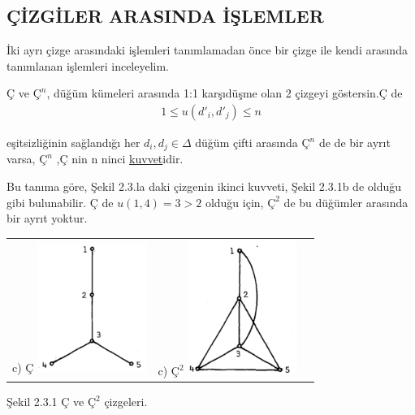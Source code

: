 \documentclass[11pt]{amsbook}
\begin{document}

    \subsection{ÇİZGİLER ARASINDA İŞLEMLER}
    
    İki ayrı çizge arasındaki işlemleri tanımlamadan önce bir çizge ile kendi arasında tanımlanan işlemleri inceleyelim.
    
    \begin{definition}
        Ç ve $Ç^n$, düğüm kümeleri arasında 1:1 karşıdüşme olan 2 çizgeyi göstersin.Ç de
        \begin{align*}
            1 \leq u(d'_{i},d'_{j}) \leq n
        \end{align*}
        
        \hfill\begin{minipage}{\dimexpr\textwidth-18mm}
        eşitsizliğinin sağlandığı her $d_{i},d_{j}\in\Delta$ düğüm çifti arasında $Ç^n$ de de bir ayrıt varsa, $Ç^n$ ,Ç nin n ninci \underline{kuvvet}idir. 
        \xdef\tpd{\the\prevdepth}
        \end{minipage} 
        
    \end{definition}
    
    Bu tanıma göre, Şekil 2.3.la daki çizgenin ikinci kuvveti, Şekil 2.3.1b de olduğu gibi bulunabilir. Ç de $u(1,4)=3>2$ olduğu için, $Ç^2$ de bu düğümler arasında bir ayrıt yoktur.
    
    
    \begin{table}[ht]
        \begin{tabular}{l@{\hskip 1.5in}c@{\hskip 0.5in}c}
            \item[c)] Ç
            \includegraphics[width=1.4in]{images/ceyhun-065-fig01.png} &
            \item[c)] $Ç^2$
            \includegraphics[width=1.4in]{images/ceyhun-065-fig02.png}
        \end{tabular}
    \end{table}
    
    Şekil 2.3.1 Ç ve $Ç^2$ çizgeleri.
\end{document}
